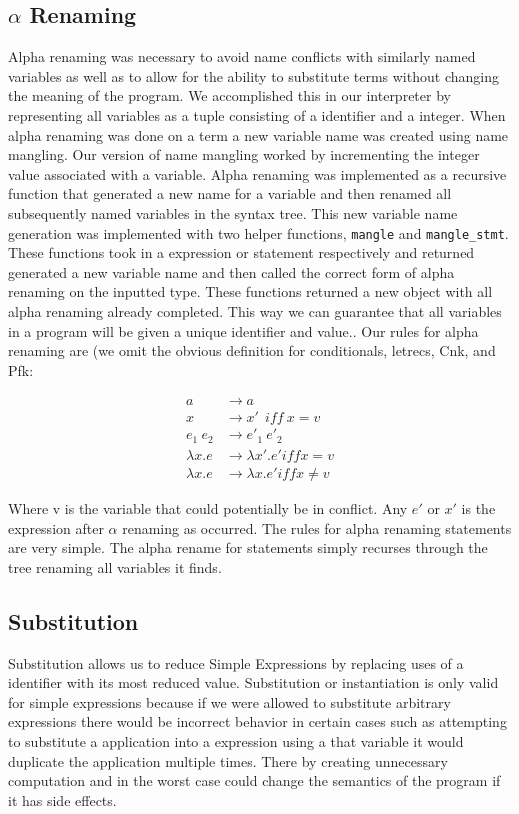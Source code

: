 \documentclass[preprint, 10pt]{sigplanconf}
\begin{document}
\subsection{$\alpha$ Renaming}
Alpha renaming was necessary to avoid name conflicts with similarly named variables as well as to allow for the ability to substitute terms without changing the meaning of the program. We accomplished this in our interpreter by representing all variables as a tuple consisting of a identifier and a integer. When alpha renaming was done on a term a new variable name was created using name mangling. Our version of name mangling worked by incrementing the integer value associated with a variable. Alpha renaming was implemented as a recursive function that generated a new name for a variable and then renamed all subsequently named variables in the syntax tree. This new variable name generation was implemented with two helper functions, \verb#mangle# and \verb#mangle_stmt#. These functions took in a expression or statement respectively and returned generated a new variable name and then called the correct form of alpha renaming on the inputted type. These functions returned a new object with all alpha renaming already completed.  This way we can guarantee that all variables in a program will be given a unique identifier and value.. Our rules for alpha renaming are (we omit the obvious definition for conditionals, letrecs, Cnk, and Pfk: 

\begin{align}
a &\rightarrow a \\
x &\rightarrow x'\ \ iff\ x = v\\
e_{1}\ e_{2} &\rightarrow e'_{1}\ e'_{2}\\
\lambda x.e &\rightarrow  \lambda x'.e' iff x = v\\
\lambda x.e &\rightarrow  \lambda x.e' iff x \neq v
\end{align}

Where v is the variable that could potentially be in conflict. Any $e'$ or $x'$ is the expression after $\alpha$ renaming as occurred. The rules for alpha renaming statements are very simple. The alpha rename for statements simply recurses through the tree renaming all variables it finds. 

\subsection{Substitution}
Substitution allows us to reduce Simple Expressions by replacing uses of a identifier with its most reduced value. Substitution or instantiation is only valid for simple expressions because if we were allowed to substitute arbitrary expressions there would be incorrect behavior in certain cases such as attempting to substitute a application into a expression using a that variable it would duplicate the application multiple times. There by creating unnecessary computation and in the worst case could change the semantics of the program if it has side effects. 
\end{document}
